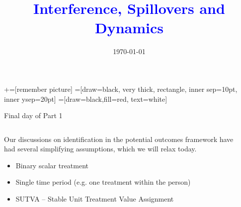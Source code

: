 \documentclass[notes,11pt, aspectratio=169]{beamer}
\title[]{\textcolor{blue}{Interference, Spillovers and Dynamics}}
\author[PGP]{}
\institute[FRBNY]{\small{Paul Goldsmith-Pinkham}}
\date{\today}
\newenvironment{wideitemize}{\itemize\addtolength{\itemsep}{10pt}}{\enditemize}
\begin{document}
\newcommand\marktopleft[1]{%
    \tikz[overlay,remember picture] 
        \node (marker-#1-a) at (-.3em,.3em) {};%
}
\newcommand\markbottomright[2]{%
    \tikz[overlay,remember picture] 
        \node (marker-#1-b) at (0em,0em) {};%
}
+=[remember picture] 
 =[draw=black, very thick, rectangle, inner sep=10pt, inner ysep=20pt]
 =[draw=black,fill=red, text=white]

\begin{frame}
\maketitle

\end{frame}

\begin{frame}{Final day of Part 1}
\begin{columns}[T] %
  \begin{column}{.75\textwidth}
   \begin{wideitemize}
   \item Our discussions on identification in the potential outcomes
     framework have had several simplifying assumptions, which we will
     relax today.
     \begin{itemize}
     \item Binary scalar treatment
     \item Single time period (e.g. one treatment within the person)
     \item SUTVA -- Stable Unit Treatment Value Assignment
     \end{itemize}
  \end{wideitemize}

\end{column}%
  \hfill%
  \begin{column}{.5\textwidth}
    \begin{center}
    \end{center}
  \end{column}
\end{columns}
\end{frame}
\end{document}
